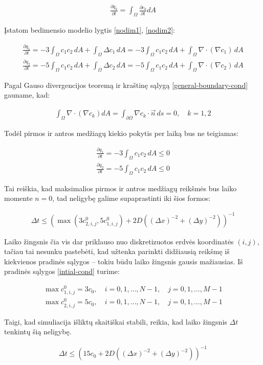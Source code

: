 \begin{align}
  \frac{\partial q_k}{\partial t} = \int_\Omega \frac{\partial c_k}{\partial t} dA
\end{align}

Įstatom bedimensio modelio lygtis \eqref{nodim1}, \eqref{nodim2}:

\begin{align}
  \frac{\partial q_1}{\partial t}=-3\int_\Omega c_1c_2\,dA + \int_\Omega \Delta c_1\,dA=-3\int_\Omega c_1c_2\,dA + \int_\Omega \nabla \cdot (\nabla c_1)\,dA\\
  \frac{\partial q_2}{\partial t}=-5\int_\Omega c_1c_2\,dA + \int_\Omega \Delta c_2\,dA=-5\int_\Omega c_1c_2\,dA + \int_\Omega \nabla \cdot (\nabla c_2)\,dA
\end{align}

\newpage
Pagal Gauso divergencijos teoremą ir kraštinę sąlygą \eqref{general-boundary-cond} gauname, kad:

\begin{align}
\int_\Omega \nabla \cdot (\nabla c_k) dA = \int_{\partial\Omega} \nabla c_k \cdot \vec{n}\, ds = 0,\quad k=1,2
\end{align}

Todėl pirmos ir antros medžiagų kiekio pokytis per laiką bus ne teigiamas:

\begin{align}
  \frac{\partial q_1}{\partial t}=-3\int_\Omega c_1c_2\,dA \leqslant 0\\
  \frac{\partial q_2}{\partial t}=-5\int_\Omega c_1c_2\,dA\leqslant 0
\end{align}

Tai reiškia, kad maksimalios pirmos ir antros medžiagų reikšmės bus laiko momente $n=0$, tad neligybę galime supaprastinti iki šios formos:

\begin{align}
  \Delta t \leqslant \left(\max(3c^{0}_{2,i,j}, 5c^{0}_{1,i,j})+2D\left((\Delta x)^{-2}+(\Delta y)^{-2}\right)\right)^{-1}
\end{align}

Laiko žingsnis čia vis dar priklauso nuo diskretizuotos erdvės koordinatės $(i, j)$, tačiau tai nesunku pastebėti, kad užtenka parinkti didžiausią reikšmę iš kiekvienos pradinės sąlygos -- tokiu būdu laiko žingsnis gausis mažiausias. Iš pradinės sąlygos \eqref{intial-cond} turime:

\begin{align*}
\max c^0_{1,i,j}=3c_0,\quad i=0,1,\dots,N-1, \quad j=0,1,\dots,M-1\\
\max c^0_{2,i,j}=5c_0,\quad i=0,1,\dots,N-1, \quad j=0,1,\dots,M-1
\end{align*}

Taigi, kad simuliacija išliktų skaitiškai stabili, reikia, kad laiko žingsnis $\Delta t$ tenkintų šią neligybę.

\begin{align*}
  \Delta t \leqslant \left(15c_0+2D\left((\Delta x)^{-2}+(\Delta y)^{-2}\right)\right)^{-1}
\end{align*}

